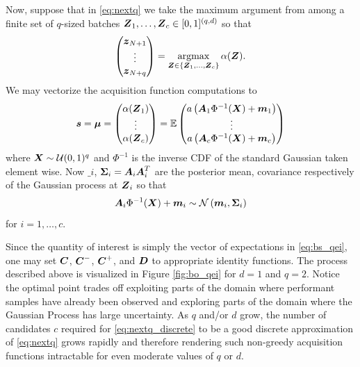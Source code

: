 \documentclass{article}[12pt]
\begin{document}
Now, suppose that in \eqref{eq:nextq} we take the maximum argument from among a finite set of $q$-sized batches $\boldsymbol{Z}_1,\dots,\boldsymbol{Z}_c \in [0,1]^{(q, d)}$ so that 
\begin{equation}
    \begin{pmatrix}\boldsymbol{z}_{N+1} \\ \vdots \\ \boldsymbol{z}_{N+q}\end{pmatrix} = \operatorname*{argmax}_{\boldsymbol{Z} \in \{\boldsymbol{Z}_1,\dots,\boldsymbol{Z}_c\}}\alpha(\boldsymbol{Z}).
    \label{eq:nextq_discrete}
\end{equation}
We may vectorize the acquisition function computations to 
\begin{equation}
    \boldsymbol{s} = \boldsymbol{\mu} = \begin{pmatrix} \alpha(\boldsymbol{Z}_1) \\ \vdots \\ \alpha(\boldsymbol{Z}_c)\end{pmatrix} = \mathbb{E}\begin{pmatrix}a\left(\boldsymbol{A}_1\Phi^{-1}(\boldsymbol{X})+\boldsymbol{m}_1\right) \\ \vdots \\ a\left(\boldsymbol{A}_c\Phi^{-1}(\boldsymbol{X})+\boldsymbol{m}_c\right)\end{pmatrix}
    \label{eq:bs_qei}
\end{equation}
where $\boldsymbol{X} \sim \mathcal{U}(0,1)^q$ and $\Phi^{-1}$ is the inverse CDF of the standard Gaussian taken element wise. Now $\bm_i$, $\boldsymbol{\Sigma}_i = \boldsymbol{A}_i\boldsymbol{A}_i^T$ are the posterior mean, covariance respectively of the Gaussian process at $\boldsymbol{Z}_i$ so that 
$$\boldsymbol{A}_i\Phi^{-1}(\boldsymbol{X})+\boldsymbol{m}_i \sim \mathcal{N}\left(\boldsymbol{m}_i,\boldsymbol{\Sigma}_i\right)$$
for $i=1,\dots,c$.

Since the quantity of interest is simply the vector of expectations in \eqref{eq:bs_qei}, one may set $\boldsymbol{C}$, $\boldsymbol{C}^-$, $\boldsymbol{C}^+$, and $\boldsymbol{D}$ to appropriate identity functions. The process described above is visualized in Figure \ref{fig:bo_qei} for $d=1$ and $q=2$. Notice the optimal point trades off exploiting parts of the domain where performant samples have already been observed and  exploring parts of the domain where the Gaussian Process has large uncertainty.  As $q$ and/or $d$ grow, the number of candidates $c$ required for \eqref{eq:nextq_discrete} to be a good discrete approximation of \eqref{eq:nextq} grows rapidly and therefore rendering such non-greedy acquisition functions intractable for even moderate values of $q$ or $d$.
\end{document}
